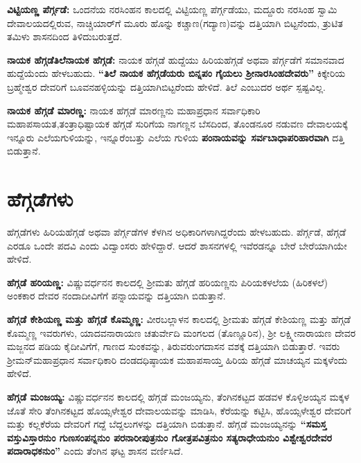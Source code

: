 \textbf{ವಿಟ್ಟಿಯಣ್ಣ ಪೆರ್ಗ್ಗಡೆ:} ಒಂದನೆಯ ನರಸಿಂಹನ ಕಾಲದಲ್ಲಿ ವಿಟ್ಟಿಯಣ್ಣ ಪೆರ್ಗ್ಗಡೆಯು, ಮದ್ದೂರು ನರಸಿಂಹ ಸ್ವಾಮಿ ದೇವಾಲಯದಲ್ಲಿರುವ, ನಾಚ್ಚಿಯಾರ್​ಗೆ ಮೂರು ಹೊನ್ನು ಕಚ್ಚಾಣ(ಗದ್ಯಾಣ)ವನ್ನು ದತ್ತಿಯಾಗಿ ಬಿಟ್ಟನೆಂದು, ತ್ರುಟಿತ ತಮಿಳು ಶಾಸನದಿಂದ ತಿಳಿದುಬರುತ್ತದೆ.

\textbf{ನಾಯಕ ಹೆಗ್ಗಡೆ\general{\enginline{-}}ತಿಲೆನಾಯಕ ಹೆಗ್ಗಡೆ:} ನಾಯಕ ಹೆಗ್ಗಡೆ ಹುದ್ದೆಯು ಹಿರಿಯಹೆಗ್ಗಡೆ ಅಥವಾ ಪೆರ್ಗ್ಗಡೆಗೆ ಸಮಾನವಾದ ಹುದ್ದೆಯೆಂದು ಹೇಳಬಹುದು. \textbf{“ತಿಲೆ ನಾಯಕ ಹೆಗ್ಗಡೆಯರು ಬಿನ್ನಪಂ ಗೈಯಲು ಶ‍್ರೀನಾರಸಿಂಹದೇವರು”} ಕಿಕ್ಕೇರಿಯ ಬ್ರಹ್ಮೇಶ್ವರ ದೇವರಿಗೆ ಬೂವನಹಳ್ಳಿಯನ್ನು ದತ್ತಿಯಾಗಿಬಿಟ್ಟರೆಂದು ಹೇಳಿದೆ. ತಿಲೆ ಎಂಬುದರ ಅರ್ಥ ಸ್ಪಷ್ಟವಿಲ್ಲ.

\textbf{ನಾಯಕ ಹೆಗ್ಗಡೆ ಮಾರಣ್ಣ:} ನಾಯಕ ಹೆಗ್ಗಡೆ ಮಾರಣ್ಣನು ಮಹಾಪ್ರಧಾನ ಸರ್ವಾಧಿಕಾರಿ ಮಹಾಪಸಾಯತ,\break ತಂತ್ರಾಧಿಷ್ಟಾಯಕ ಹೆಗ್ಗಡೆ ಸುರಿಗೆಯ ನಾಗಣ್ಣನ ಬೆಸದಿಂದ, ತೊಂಡನೂರ ನಡುವಣ ದೇವಾಲಯಕ್ಕೆ ಇನ್ನೂರು ಎಲೆಯಗುಳಿ\-ಯನ್ನು, ಇನ್ನೂರೆಂಬತ್ತು ಎಲೆಯ ಗುಳಿಯ \textbf{ಪಂನಾಯವನ್ನು ಸರ್ವಬಾಧಾಪರಿಹಾರವಾಗಿ} ದತ್ತಿ ಬಿಡುತ್ತಾನೆ.

\vskip -3pt

\section{ಹೆಗ್ಗಡೆಗಳು}

ಹೆಗ್ಗಡೆಗಳು ಹಿರಿಯಹೆಗ್ಗಡೆ ಅಥವಾ ಪೆರ್ಗ್ಗಡೆಗಳ ಕೆಳಗಿನ ಅಧಿಕಾರಿಗಳಾಗಿದ್ದರೆಂದು ಹೇಳಬಹುದು. ಪೆರ್ಗ್ಗಡೆ, ಹೆಗ್ಗಡೆ ಎರಡೂ ಒಂದೇ ಪದವಿ ಎಂದು ವಿದ್ವಾಂಸರು ಹೇಳಿದ್ದಾರೆ. ಆದರೆ ಶಾಸನಗಳಲ್ಲಿ ಇವೆರಡನ್ನೂ ಬೇರೆ ಬೇರೆಯಾಗಿಯೇ ಹೇಳಿದೆ.

\textbf{ಹೆಗ್ಗಡೆ ಹರಿಯಣ್ಣ: }ವಿಷ್ಣುವರ್ಧನನ ಕಾಲದಲ್ಲಿ ಶ‍್ರೀಮತು ಹೆಗ್ಗಡೆ ಹರಿಯಣ್ಣನು ಪಿರಿಯಕಳಲೆಯ (ಹಿರಿಕಳಲೆ) ಅಂಕಕಾರ ದೇವರ ನಂದಾದೀವಿಗೆಗೆ ಪನ್ನಾಯವನ್ನು ದತ್ತಿಯಾಗಿ ಬಿಡುತ್ತಾನೆ.

\textbf{ಹೆಗ್ಗಡೆ ಕೇಶಿಯಣ್ಣ ಮತ್ತು ಹೆಗ್ಗಡೆ ಕೊಮ್ಮಣ್ಣ:} ವೀರಬಲ್ಲಾಳನ ಕಾಲದಲ್ಲಿ ಶ‍್ರೀಮತು ಹೆಗ್ಗಡೆ ಕೇಶಿಯಣ್ಣ ಮತ್ತು ಹೆಗ್ಗಡೆ ಕೊಮ್ಮಣ್ಣ ಇವರುಗಳು, ಯಾದವನಾರಾಯಣ ಚತುರ್ವೇದಿ ಮಂಗಲದ (ತೊಣ್ಣೂರಿನ), ಶ‍್ರೀ ಲಕ್ಷ್ಮೀನಾರಾಯಣ ದೇವರ ಮಜ್ಜನದ ಪಡಿಯ ಕೈದೀವಿಗೆಗೆ, ಗಾಣದ ಸುಂಕವನ್ನು, ತಿರುವರುಂಗದಾಸನ ವಶಕ್ಕೆ ದತ್ತಿಯಾಗಿ ಬಿಡುತ್ತಾರೆ. ಇವರು ಶ‍್ರೀಮನ್​ಮಹಾಪ್ರಧಾನ ಸರ್ವಾಧಿಕಾರಿ ದಂಡದಧಿಷ್ಠಾಯಕ ಮಹಾಪಸಾಯ್ತ ಹಿರಿಯ ಹೆಗ್ಗಡೆ ಮಾಚಯ್ಯನ ಮಕ್ಕಳೆಂದು ಹೇಳಿದೆ.

\textbf{ಹೆಗ್ಗಡೆ ಮಂಜಯ್ಯ:} ವಿಷ್ಣುವರ್ಧನನ ಕಾಲದಲ್ಲಿ ಹೆಗ್ಗಡೆ ಮಂಜಯ್ಯನು, ತೆಂಗಿನಕಟ್ಟದ ಹಡವಳ ಕೊಳ್ಳಿಅಯ್ಯನ ಮಕ್ಕಳ ಜೊತೆ ಸೇರಿ ತೆಂಗಿನಕಟ್ಟದ ಹೊಯ್ಸಳೇಶ್ವರ ದೇವಾಲಯವನ್ನು ಮಾಡಿಸಿ, ಕೆರೆಯನ್ನು ಕಟ್ಟಿಸಿ, ಹೊಯ್ಸಳೇಶ್ವರ ದೇವರಿಗೆ ಮತ್ತು ಕಲ್ಲಕೆರೆಯ ದೇವರಿಗೆ ಗದ್ದೆ ಬೆದ್ದಲುಗಳನ್ನು ದತ್ತಿಯಾಗಿ ಬಿಡುತ್ತಾನೆ. ಹೆಗ್ಗಡೆ ಮಂಜಯ್ಯನನ್ನು \textbf{“ಸಮಸ್ತ ವಸ್ತುವಿಸ್ತಾರನುಂ ಗುಣಸಂಪನ್ನನುಂ ಪರನಾರೀಪುತ್ರನುಂ ಗೋತ್ರಪವಿತ್ರನುಂ ಸತ್ಯರಾಧೇಯನುಂ ವಿಶ್ವೇಶ್ವರದೇವರ ಪದಾರಾಧಕನುಂ”} ಎಂದು ತೆಂಗಿನ ಘಟ್ಟ ಶಾಸನ ವರ್ಣಿಸಿದೆ.

